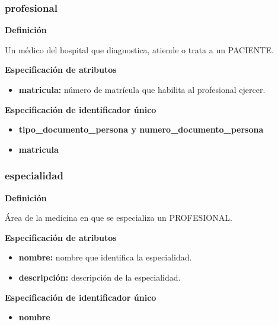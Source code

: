 \documentclass[a4paper,11pt]{article}
\begin{document}
\subsubsection{\textbf{profesional}}

\textbf{Definición}

Un médico del hospital que diagnostica, atiende o trata a un PACIENTE.

\textbf{Especificación de atributos}

\begin{itemize}

     \item \textbf{matricula:} número de matrícula que habilita al profesional ejercer.

\end{itemize}

\textbf{Especificación de identificador único}

\begin{itemize}


    \item \textbf{tipo\_documento\_persona y numero\_documento\_persona}

    \item \textbf{matricula}

\end{itemize}

\subsubsection{\textbf{especialidad}}

\textbf{Definición}

Área de la medicina en que se especializa un PROFESIONAL.

\textbf{Especificación de atributos}

\begin{itemize}

     \item \textbf{nombre:} nombre que identifica la especialidad.

     \item \textbf{descripción:} descripción de la especialidad.

\end{itemize}

\textbf{Especificación de identificador único}

\begin{itemize}

     \item \textbf{nombre}

\end{itemize}
\end{document}
